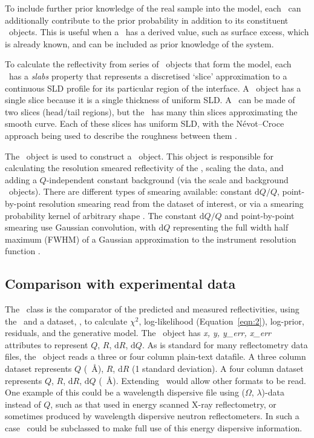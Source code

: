 \documentclass[pdf,preprint]{iucr}
\begin{document}
To include further prior knowledge of the real sample into the model,
each \Component\ can additionally contribute to the prior probability in addition to its constituent \Parameter\ objects. This is useful when a \Component\ has a derived value, such as surface excess, which is already known, and can be included as prior knowledge of the system.

To calculate the reflectivity from series of \Component\ objects that form the model,
each \Component\ has a \emph{slabs} property that represents a discretised `slice' approximation to a continuous SLD profile for its particular region of the interface. A \Slab\ object has a single slice because it is a single thickness of uniform SLD. A \LipidLeaflet\ can be made of two slices (head/tail regions), but the \Spline\ has many thin slices approximating the smooth curve. Each of these slices has uniform SLD, with the N\'{e}vot--Croce approach being used to describe the roughness between them \cite{Nevot1980}.

The \Structure\ object is used to construct a \ReflectModel\ object. This object is responsible for calculating the resolution smeared reflectivity of the \Structure, scaling the data, and adding a $Q$-independent constant background (via the scale and background \Parameter\ objects). There are different types of smearing available: constant $\mathrm{d}Q/Q$, point-by-point resolution smearing read from the dataset of interest, or via a smearing probability kernel of arbitrary shape \cite{Nelson2014}. The constant $\mathrm{d}Q/Q$ and point-by-point smearing use Gaussian convolution, with $\mathrm{d}Q$ representing the full width half maximum (FWHM) of a Gaussian approximation to the instrument resolution function \cite{Well2005}.

\subsection{Comparison with experimental data}

The \Objective\ class is the comparator of the predicted and measured reflectivities, using the \ReflectModel\ and a dataset, \DataD, to calculate $\chi^2$, log-likelihood (Equation~\ref{eqn:2}), log-prior, residuals, and the generative model.
The \DataD\ object has \emph{x, y, y\_err, x\_err} attributes to represent $Q$, $R$, $\mathrm{d}R$, $\mathrm{d}Q$. As is standard for many reflectometry data files, the \DataD\ object reads a three or four column plain-text datafile. A three column dataset represents $Q$ (\si{\per\angstrom}), $R$, $\mathrm{d}R$ (1 standard deviation). A four column dataset represents $Q$, $R$, $\mathrm{d}R$, $\mathrm{d}Q$ (\si{\per\angstrom}). Extending \DataD\ would allow other formats to be read. One example of this could be a wavelength dispersive file using ($\Omega$, $\lambda$)-data instead of $Q$, such as that used in energy scanned X-ray reflectometry, or sometimes produced by wavelength dispersive neutron reflectometers. In such a case \ReflectModel\ could be subclassed to make full use of this energy dispersive information.
\end{document}
